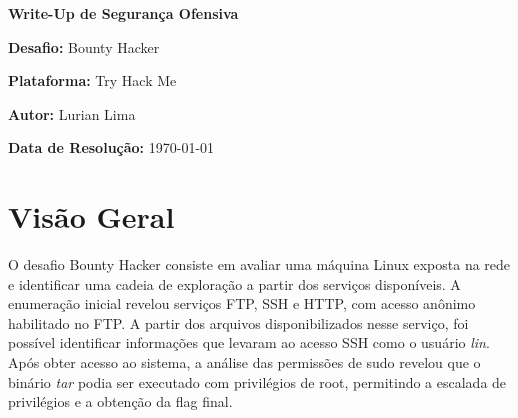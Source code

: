 \documentclass[12pt]{article} %
\begin{document}
\begin{titlepage}
    \centering
    \vspace*{2cm}
    {\Huge \textbf{Write-Up de Segurança Ofensiva} \par}
    \vspace{1.5cm}
    {\Large \textbf{Desafio:} Bounty Hacker \par}
    {\large \textbf{Plataforma:} Try Hack Me \par}
    {\large \textbf{Autor:} Lurian Lima \par}
    \vspace{2cm}
    {\large \textbf{Data de Resolução:} \today \par}
    \vfill
\end{titlepage}

\tableofcontents
\newpage



\section{Visão Geral}

O desafio Bounty Hacker consiste em avaliar uma máquina Linux exposta na rede e identificar uma cadeia de exploração a partir dos serviços disponíveis. A enumeração inicial revelou serviços FTP, SSH e HTTP, com acesso anônimo habilitado no FTP. A partir dos arquivos disponibilizados nesse serviço, foi possível identificar informações que levaram ao acesso SSH como o usuário \textit{lin}. Após obter acesso ao sistema, a análise das permissões de sudo revelou que o binário \textit{tar} podia ser executado com privilégios de root, permitindo a escalada de privilégios e a obtenção da flag final.
\end{document}
